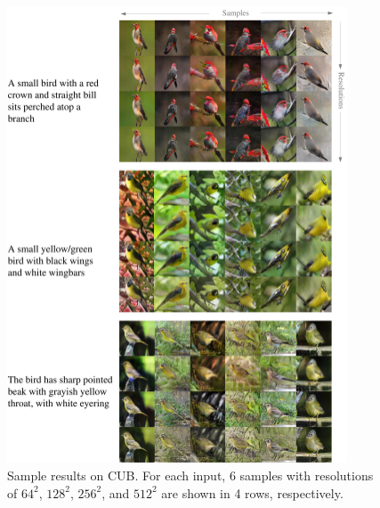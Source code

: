 \documentclass[10pt, letterpaper]{article}
\begin{document}
\begin{figure}[th!]
    \centering
    \includegraphics[width=0.9\textwidth]{figure/supp_bird.pdf}

    \caption{Sample results on CUB. For each input, 6 samples with resolutions of $64^2$, $128^2$, $256^2$, and $512^2$ are shown in 4 rows, respectively. }  
    \label{fig:bird}
\end{figure}

\newpage

\end{document}

